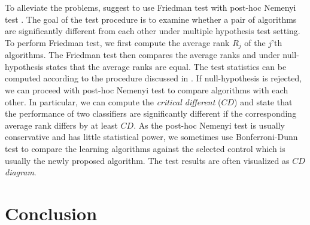 {To alleviate the problems, \citet{Demsar06statistical} suggest to use Friedman test \citep{Friedman37the,Friedman40Comparison} with post-hoc Nemenyi test \citep{Nemenyi63distribution}.
The goal of the test procedure is to examine whether a pair of algorithms are significantly different from each other under multiple hypothesis test setting.
To perform Friedman test, we first compute the average rank $R_j$ of the $j$'th algorithms.
The Friedman test then compares the average ranks and under null-hypothesis states that the average ranks are equal.
The test statistics can be computed according to the procedure discussed in \citep{Demsar06statistical}.
If null-hypothesis is rejected, we can proceed with post-hoc Nemenyi test to compare algorithms with each other.
In particular, we can compute the \textit{critical different} ($CD$) and state that the performance of two classifiers are significantly different if the corresponding average rank differs by at least $CD$.
As the post-hoc Nemenyi test is usually conservative and has little statistical power, we sometimes use Bonferroni-Dunn test \citep{Dunn61mulitple} to compare the learning algorithms against the selected control which is usually the newly proposed algorithm.
The test results are often visualized as \textit{$CD$ diagram}.





%
%










%
%
\chapter{Conclusion}\label{ch_conclusion}

}

